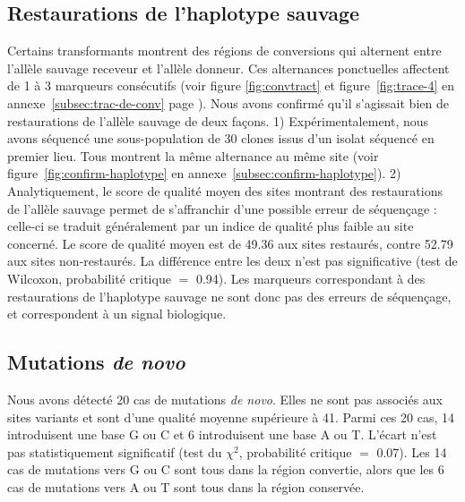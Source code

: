 \subsection{Restaurations de l'haplotype sauvage}
\label{subsec:restaur}

Certains transformants montrent des régions de conversions qui alternent entre
l'allèle sauvage receveur et l'allèle donneur. Ces alternances ponctuelles
affectent de 1 à 3 marqueurs consécutifs (voir figure \ref{fig:convtract} et
figure~\ref{fig:trace-4} en annexe~\ref{subsec:trac-de-conv}
page \pageref{fig:trace-4}). Nous avons confirmé qu'il s'agissait bien de
restaurations de l'allèle sauvage de deux façons. 1) Expérimentalement, nous
avons séquencé une sous-population de 30 clones issus d'un isolat séquencé en
premier lieu. Tous montrent la même alternance au même site (voir
figure~\ref{fig:confirm-haplotype} en annexe~\ref{subsec:confirm-haplotype}). 2)
Analytiquement, le score de qualité moyen des sites montrant des restaurations
de l'allèle sauvage permet de s'affranchir d'une possible erreur de séquençage :
celle-ci se traduit généralement par un indice de qualité plus faible au site
concerné. Le score de qualité moyen est de \num{49.36} aux sites restaurés,
contre \num{52.79} aux sites non-restaurés. La différence entre les deux n'est
pas significative (test de Wilcoxon, probabilité critique \(=\) \num{0.94}). Les
marqueurs correspondant à des restaurations de l'haplotype sauvage ne sont donc
pas des erreurs de séquençage, et correspondent à un signal biologique.

\subsection{Mutations \emph{de novo}}
\label{subsec:result-neomutat}

Nous avons détecté \num{20} cas de mutations \emph{de novo}. Elles ne sont pas
associés aux sites variants et sont d'une qualité moyenne supérieure à \num{41}.
Parmi ces \num{20} cas, \num{14} introduisent une base G ou C et 6 introduisent
une base A ou T. L'écart n'est pas statistiquement significatif (test du
$\chi^2$, probabilité critique \(=\) \num{0.07}). Les \num{14} cas de mutations
vers G ou C sont tous dans la région convertie, alors que les \num{6} cas de
mutations vers A ou T sont tous dans la région conservée.


